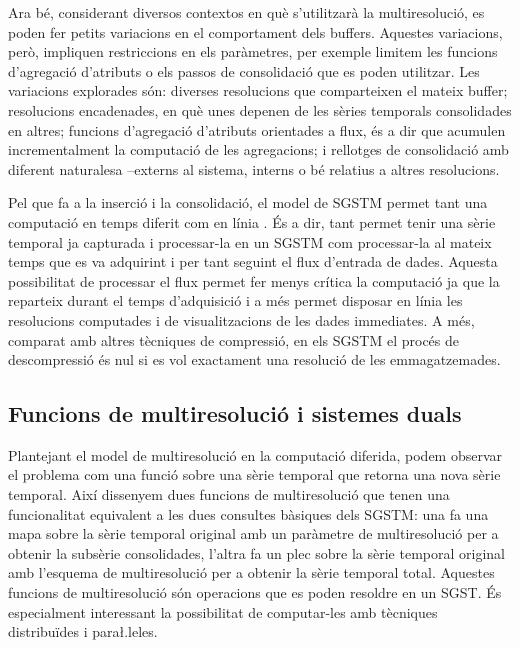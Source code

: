 Ara bé, considerant diversos contextos en què s'utilitzarà la
multiresolució, es poden fer petits variacions en el comportament dels
buffers. Aquestes variacions, però, impliquen restriccions en els
paràmetres, per exemple limitem les funcions d'agregació d'atributs o
els passos de consolidació que es poden utilitzar.  Les variacions
explorades són: diverses resolucions que comparteixen el mateix
buffer; resolucions encadenades, en què unes depenen de les sèries
temporals consolidades en altres; funcions d'agregació d'atributs
orientades a flux, és a dir que acumulen incrementalment la computació
de les agregacions; i rellotges de consolidació amb diferent
naturalesa --externs al sistema, interns o bé relatius a altres
resolucions.







Pel que fa a la inserció i la consolidació, el model de \gls{SGSTM}
permet tant una computació en temps diferit com en línia . És a dir,
tant permet tenir una sèrie temporal ja capturada i processar-la en un
\gls{SGSTM} com processar-la al mateix temps que es va adquirint i per
tant seguint el flux d'entrada de dades.  Aquesta possibilitat de
processar el flux permet fer menys crítica la computació ja que la
reparteix durant el temps d'adquisició i a més permet disposar en línia
 les resolucions computades i de visualitzacions de les dades immediates.
A més, comparat amb altres tècniques de compressió, en els \gls{SGSTM} el procés de descompressió és nul si es vol exactament una resolució de les emmagatzemades.








\subsection{Funcions de multiresolució i sistemes duals}




Plantejant el model de multiresolució en la computació diferida, podem
observar el problema com una funció sobre una sèrie temporal que
retorna una nova sèrie temporal. Així dissenyem dues funcions de
multiresolució que tenen una funcionalitat equivalent a les dues
consultes bàsiques dels \gls{SGSTM}: una fa una mapa sobre la sèrie
temporal original amb un paràmetre de multiresolució per a obtenir la
subsèrie consolidades, l'altra fa un plec sobre la sèrie temporal
original amb l'esquema de multiresolució per a obtenir la sèrie
temporal total.  Aquestes funcions de multiresolució són operacions
que es poden resoldre en un \gls{SGST}. És especialment interessant la
possibilitat de computar-les amb tècniques distribuïdes i
para\l.leles.





